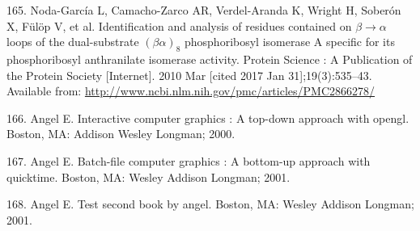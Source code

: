 \documentclass[12pt,twoside]{reedthesis}
\begin{document}
  \hypertarget{ref-noda-garcia_identification_2010}{}
  165. Noda-García L, Camacho-Zarco AR, Verdel-Aranda K, Wright H, Soberón
  X, Fülöp V, et al. Identification and analysis of residues contained on
  \(\beta \rightarrow \alpha\) loops of the dual-substrate
  \((\beta\alpha)_8\) phosphoribosyl isomerase A specific for its
  phosphoribosyl anthranilate isomerase activity. Protein Science : A
  Publication of the Protein Society {[}Internet{]}. 2010 Mar {[}cited
  2017 Jan 31{]};19(3):535--43. Available from:
  \url{http://www.ncbi.nlm.nih.gov/pmc/articles/PMC2866278/}
  
  \hypertarget{ref-angel2000}{}
  166. Angel E. Interactive computer graphics : A top-down approach with
  opengl. Boston, MA: Addison Wesley Longman; 2000.
  
  \hypertarget{ref-angel2001}{}
  167. Angel E. Batch-file computer graphics : A bottom-up approach with
  quicktime. Boston, MA: Wesley Addison Longman; 2001.
  
  \hypertarget{ref-angel2002a}{}
  168. Angel E. Test second book by angel. Boston, MA: Wesley Addison
  Longman; 2001.


\end{document}
